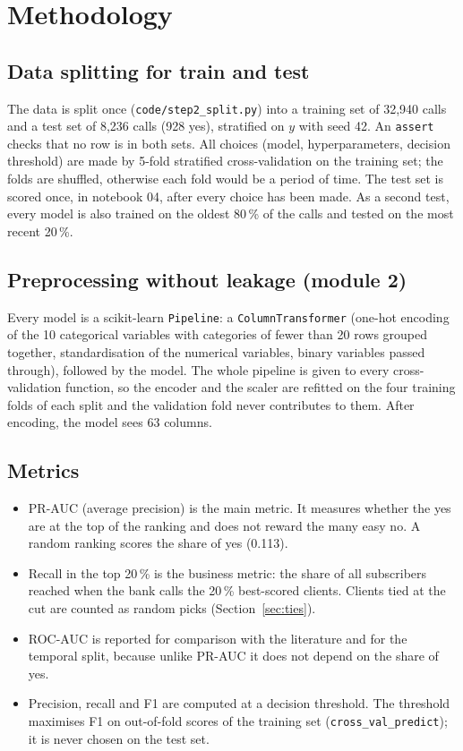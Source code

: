 \documentclass[11pt,a4paper]{article}
\begin{document}
\section{Methodology}\label{sec:method}

\subsection{Data splitting for train and test}
The data is split once (\texttt{code/step2\_split.py}) into a training set of 32,940 calls and a test set of 8,236
calls (928 yes), stratified on $y$ with seed 42. An \texttt{assert} checks that no row is in both sets. All choices
(model, hyperparameters, decision threshold) are made by 5-fold stratified cross-validation on the training set; the
folds are shuffled, otherwise each fold would be a period of time. The test set is scored once, in notebook 04, after
every choice has been made. As a second test, every model is also trained on the oldest 80\,\% of the calls and
tested on the most recent 20\,\%.

\subsection{Preprocessing without leakage (module 2)}
Every model is a scikit-learn \texttt{Pipeline}: a \texttt{ColumnTransformer} (one-hot encoding of the 10
categorical variables with categories of fewer than 20 rows grouped together, standardisation of the numerical
variables, binary variables passed through), followed by the model. The whole pipeline is given to every
cross-validation function, so the encoder and the scaler are refitted on the four training folds of each split and
the validation fold never contributes to them. After encoding, the model sees 63 columns.

\subsection{Metrics}
\begin{itemize}
\item PR-AUC (average precision) is the main metric. It measures whether the yes are at the top of the
ranking and does not reward the many easy no. A random ranking scores the share of yes (0.113).
\item Recall in the top 20\,\% is the business metric: the share of all subscribers reached when the bank
calls the 20\,\% best-scored clients. Clients tied at the cut are counted as random picks (Section~\ref{sec:ties}).
\item ROC-AUC is reported for comparison with the literature and for the temporal split, because unlike
PR-AUC it does not depend on the share of yes.
\item Precision, recall and F1 are computed at a decision threshold. The threshold maximises F1 on out-of-fold scores of
the training set (\texttt{cross\_val\_predict}); it is never chosen on the test set.
\end{itemize}
\end{document}
